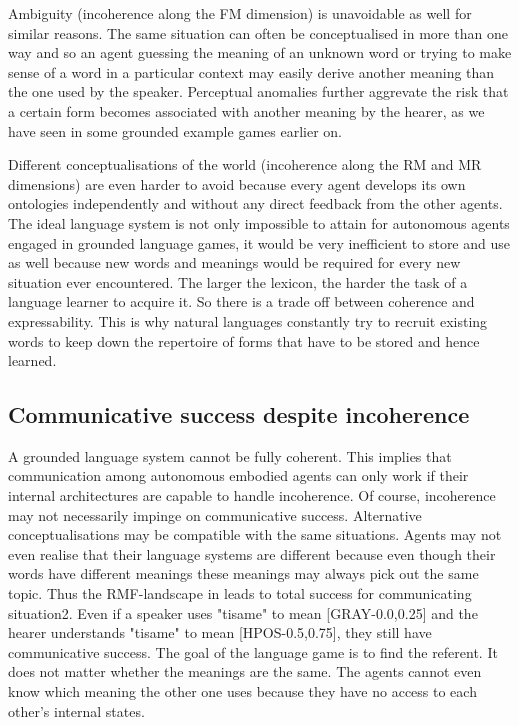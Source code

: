 Ambiguity (incoherence along the FM dimension) 
is unavoidable as well for similar reasons. 
The same situation can often be conceptualised in more than 
one way and so an agent guessing the meaning of an unknown 
word or trying to make sense of a word in a particular 
context may easily derive another meaning than the one 
used by the speaker. Perceptual anomalies further aggrevate
the risk that a certain form becomes associated with 
another meaning by the hearer, as we have seen in some
grounded example games earlier on. 

Different conceptualisations of the world (incoherence 
along the RM and MR dimensions) are even harder to 
avoid because every agent develops its own 
ontologies independently and without any direct 
feedback from the other agents. 
The ideal language system is not only impossible to 
attain for autonomous agents engaged in grounded
language games, it would be very 
inefficient to store and use as well because 
new words and meanings would be required for every new 
situation ever encountered. The larger the lexicon,
the harder the task of a language learner to acquire it. 
So there is a trade off between coherence and expressability. 
This is why natural languages constantly try to recruit existing 
words to keep down the repertoire of 
forms that have to be stored and hence learned.

\subsection{Communicative success despite incoherence}

A grounded language system cannot be fully coherent. 
This implies that communication among autonomous 
embodied agents can only work if their internal 
architectures are capable to handle incoherence. 
Of course, incoherence may not necessarily 
impinge on communicative success. 
Alternative conceptualisations may 
be compatible with the same situations. Agents may not
even realise that their language systems are different
because even though their words have different 
meanings these meanings may always pick out the 
same topic. Thus 
the RMF-landscape in  leads to total
success for communicating situation2. Even if 
a speaker uses "tisame" to mean [GRAY-0.0,0.25] and the hearer
understands "tisame" to mean [HPOS-0.5,0.75], they 
still have communicative success. The goal 
of the language game is to find the referent. It does
not matter whether the meanings are the same. The agents
cannot even know which meaning the other one uses
because they have no access to each other's internal states. 

